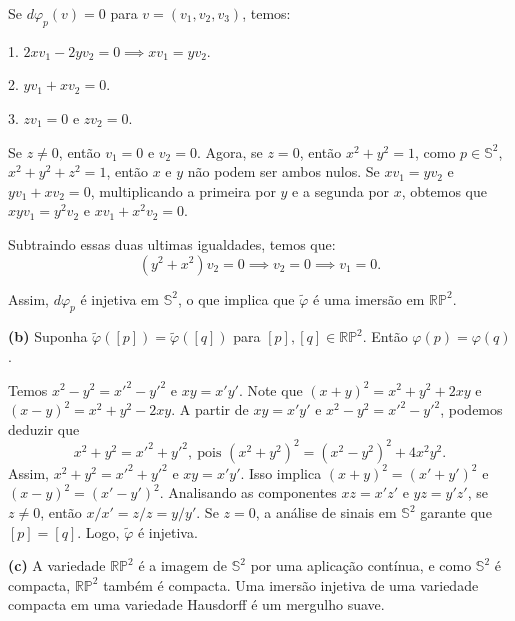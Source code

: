 {	Se $d\varphi_p(v) = 0$ para $v=(v_1, v_2, v_3)$, temos:
	
	1. $2xv_1 - 2yv_2 = 0 \implies xv_1 = yv_2$.
	
	2. $yv_1 + xv_2 = 0$.
	
	3. $zv_1 = 0$ e $zv_2 = 0$.
	
	Se $z \neq 0$, então $v_1=0$ e $v_2=0$. Agora, se $z=0$, então $x^2+y^2=1$, como $p \in \mathbb{S}^2$, $x^2+y^2+z^2=1$, então $x$ e $y$ não podem ser ambos nulos. Se $xv_1 = yv_2$ e $yv_1 + xv_2 = 0$, multiplicando a primeira por $y$ e a segunda por $x$, obtemos que $xyv_1 = y^2v_2$ e $xv_1 + x^2v_2 = 0$. 
	
	Subtraindo essas duas ultimas igualdades, temos que: $$(y^2+x^2)v_2 = 0 \implies v_2=0 \implies v_1=0.$$ 
	
	Assim, $d\varphi_p$ é injetiva em $\mathbb{S}^2$, o que implica que $\tilde{\varphi}$ é uma imersão em $\mathbb{RP}^2$.
	
	\textbf{(b)}
	Suponha $\tilde{\varphi}([p]) = \tilde{\varphi}([q])$ para $[p], [q] \in \mathbb{RP}^2$. Então $\varphi(p) = \varphi(q)$.
	
	Temos $x^2-y^2 = x'^2-y'^2$ e $xy = x'y'$. Note que $(x+y)^2 = x^2+y^2+2xy$ e $(x-y)^2 = x^2+y^2-2xy$. 
	A partir de $xy=x'y'$ e $x^2-y^2 = x'^2-y'^2$, podemos deduzir que $$x^2+y^2 = x'^2+y'^2, \ \text{pois } (x^2+y^2)^2 = (x^2-y^2)^2 + 4x^2y^2.$$
	Assim, $x^2+y^2=x'^2+y'^2$ e $xy=x'y'$. Isso implica $(x+y)^2 = (x'+y')^2$ e $(x-y)^2 = (x'-y')^2$.
	Analisando as componentes $xz=x'z'$ e $yz=y'z'$, se $z \neq 0$, então $x/x' = z/z = y/y'$. Se $z=0$, a análise de sinais em $\mathbb{S}^2$ garante que $[p] = [q]$. Logo, $\tilde{\varphi}$ é injetiva.
	
	\textbf{(c)}
	A variedade $\mathbb{RP}^2$ é a imagem de $\mathbb{S}^2$ por uma aplicação contínua, e como $\mathbb{S}^2$ é compacta, $\mathbb{RP}^2$ também é compacta. Uma imersão injetiva de uma variedade compacta em uma variedade Hausdorff é um mergulho suave.
}

